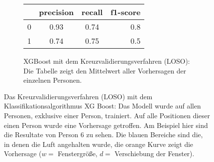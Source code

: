 \begin{figure}[ht]
  \begin{subfigure}{1\textwidth}
      \begin{center}
          \begin{tabular}{ | l | c | c | r | }
            \hline
             & precision & recall & f1-score \\ \hline
            0 & 0.93 & 0.74 & 0.8 \\ \hline
            1 & 0.74 & 0.75 & 0.5 \\
            \hline
          \end{tabular}
      \end{center}
      \caption{XGBoost mit dem Kreuzvalidierungsverfahren (LOSO): Die Tabelle zeigt den Mittelwert aller Vorhersagen der einzelnen Personen.}
      \label{implementation:app:screenshots:user_studies_information}
  \end{subfigure}
    \caption{Das Kreuzvalidierungsverfahren (LOSO) mit dem Klassifikationsalgorithmus XG Boost: Das Modell wurde auf allen Personen, exklusive einer Person, trainiert. Auf alle Positionen dieser einen Person wurde eine Vorhersage getroffen. Am Beispiel hier sind die Resultate von Person 6 zu sehen. Die blauen Bereiche sind die, in denen die Luft angehalten wurde, die orange Kurve zeigt die Vorhersage ($w=$ Fenstergröße, $d=$ Verschiebung der Fenster).}
\label{evaluation:xgboost_loso:person6}
\end{figure}

